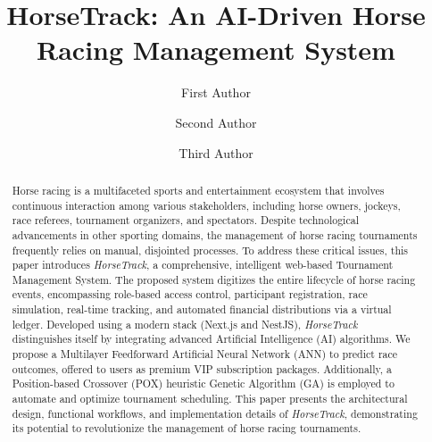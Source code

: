\documentclass{llncs}
\begin{document}
%
\title{HorseTrack: An AI-Driven Horse Racing Management System}
%
%
\author{First Author \and
Second Author \and
Third Author}
%
%
%
\maketitle              
%
\begin{abstract}
Horse racing is a multifaceted sports and entertainment ecosystem that involves continuous interaction among various stakeholders, including horse owners, jockeys, race referees, tournament organizers, and spectators. Despite technological advancements in other sporting domains, the management of horse racing tournaments frequently relies on manual, disjointed processes. To address these critical issues, this paper introduces \textit{HorseTrack}, a comprehensive, intelligent web-based Tournament Management System. The proposed system digitizes the entire lifecycle of horse racing events, encompassing role-based access control, participant registration, race simulation, real-time tracking, and automated financial distributions via a virtual ledger. Developed using a modern stack (Next.js and NestJS), \textit{HorseTrack} distinguishes itself by integrating advanced Artificial Intelligence (AI) algorithms. We propose a Multilayer Feedforward Artificial Neural Network (ANN) to predict race outcomes, offered to users as premium VIP subscription packages. Additionally, a Position-based Crossover (POX) heuristic Genetic Algorithm (GA) is employed to automate and optimize tournament scheduling. This paper presents the architectural design, functional workflows, and implementation details of \textit{HorseTrack}, demonstrating its potential to revolutionize the management of horse racing tournaments.

\end{abstract}
%
%
%
\end{document}

